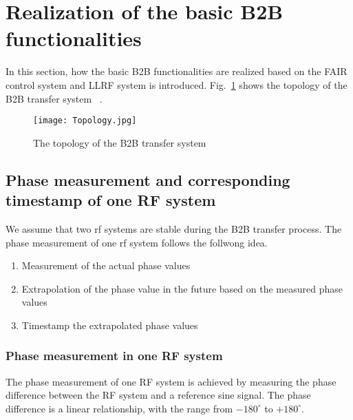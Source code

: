\section{Realization of the basic B2B functionalities}
In this section, how the basic B2B functionalities are realized based on the FAIR control system and LLRF system is introduced.
Fig.~\ref{Topology} shows the topology of the B2B transfer system ~\cite{bai_bunch_2015, bai_concept_2016}.
\begin{figure}[!htb]
   \centering   
   \texttt{[image: Topology.jpg]}
   \caption{The topology of the B2B transfer system}
   \label{Topology}
\end{figure}
%
\subsection{Phase measurement and corresponding timestamp of one RF system}
We assume that two rf systems are stable during the B2B transfer process. The phase measurement of one rf system follows the follwong idea.
\begin{enumerate}
\item Measurement of the actual phase values
\item Extrapolation of the phase value in the future based on the measured phase values
\item Timestamp the extrapolated phase values
\end{enumerate}
 \subsubsection{Phase measurement in one RF system}
The phase measurement of one RF system is achieved by measuring the phase difference between the RF system and a reference sine signal. The phase difference is a linear relationship, with the range from $-180^\circ$ to $+180^\circ$. 

